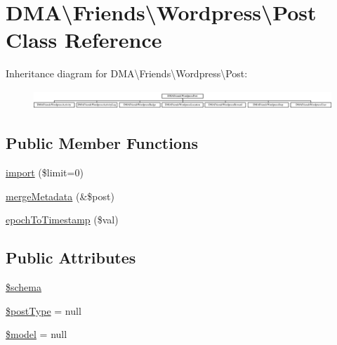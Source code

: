 \hypertarget{classDMA_1_1Friends_1_1Wordpress_1_1Post}{\section{D\-M\-A\textbackslash{}Friends\textbackslash{}Wordpress\textbackslash{}Post Class Reference}
\label{classDMA_1_1Friends_1_1Wordpress_1_1Post}
}
Inheritance diagram for D\-M\-A\textbackslash{}Friends\textbackslash{}Wordpress\textbackslash{}Post\-:\begin{figure}[H]
\begin{center}
\leavevmode
\includegraphics[height=0.701754cm]{d2/de2/classDMA_1_1Friends_1_1Wordpress_1_1Post}
\end{center}
\end{figure}
\subsection*{Public Member Functions}
\begin{DoxyCompactItemize}
\item 
\hyperlink{classDMA_1_1Friends_1_1Wordpress_1_1Post_a4eb2c6b3e89a43b3221e9e2564059510}{import} (\$limit=0)
\item 
\hyperlink{classDMA_1_1Friends_1_1Wordpress_1_1Post_adb1c6652d06b360d1f81d14dde95b5b1}{merge\-Metadata} (\&\$post)
\item 
\hyperlink{classDMA_1_1Friends_1_1Wordpress_1_1Post_af6960d9c63c4224f6f481c88d2b5d076}{epoch\-To\-Timestamp} (\$val)
\end{DoxyCompactItemize}
\subsection*{Public Attributes}
\begin{DoxyCompactItemize}
\item 
\hyperlink{classDMA_1_1Friends_1_1Wordpress_1_1Post_a38fc35f2a6a04046e386cfd3f3564d89}{\$schema}
\item 
\hyperlink{classDMA_1_1Friends_1_1Wordpress_1_1Post_a9b0ea251e8ba6b7161fc51ffa8fb72d8}{\$post\-Type} = null
\item 
\hyperlink{classDMA_1_1Friends_1_1Wordpress_1_1Post_a8a3df2e9db7f90d348d27ea9354176b1}{\$model} = null
\end{DoxyCompactItemize}
